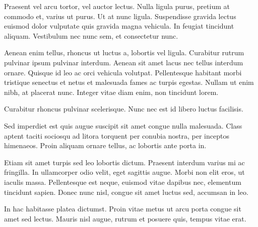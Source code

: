 \documentclass[12pt,a4paper]{report}
\begin{document}
Praesent vel arcu tortor, vel auctor lectus. Nulla ligula purus, pretium at commodo et, varius ut purus. Ut at nunc ligula. Suspendisse gravida lectus euismod dolor vulputate quis gravida magna vehicula. In feugiat tincidunt aliquam. Vestibulum nec nunc sem, et consectetur nunc. 

Aenean enim tellus, rhoncus ut luctus a, lobortis vel ligula. Curabitur rutrum pulvinar ipsum pulvinar interdum. Aenean sit amet lacus nec tellus interdum ornare. Quisque id leo ac orci vehicula volutpat. Pellentesque habitant morbi tristique senectus et netus et malesuada fames ac turpis egestas. Nullam ut enim nibh, at placerat nunc. Integer vitae diam enim, non tincidunt lorem. 

Curabitur rhoncus pulvinar scelerisque. Nunc nec est id libero luctus facilisis.

Sed imperdiet est quis augue suscipit sit amet congue nulla malesuada. Class aptent taciti sociosqu ad litora torquent per conubia nostra, per inceptos himenaeos. Proin aliquam ornare tellus, ac lobortis ante porta in. 

Etiam sit amet turpis sed leo lobortis dictum. Praesent interdum varius mi ac fringilla. In ullamcorper odio velit, eget sagittis augue. Morbi non elit eros, ut iaculis massa. Pellentesque est neque, euismod vitae dapibus nec, elementum tincidunt sapien. Donec nunc nisl, congue sit amet luctus sed, accumsan in leo. 

In hac habitasse platea dictumst. Proin vitae metus ut arcu porta congue sit amet sed lectus. Mauris nisl augue, rutrum et posuere quis, tempus vitae erat.






\end{document}
